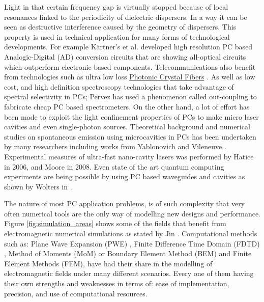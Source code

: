 Light in that certain frequency gap is virtually stopped because of local resonances linked to the periodicity of dielectric dispersers. In a way it can be seen as destructive interference caused by the geometry of dispersers. This property is used in technical application for many forms of technological developments. For example K\"{a}rtner's et al. developed high resolution PC based Analogic-Digital (AD) conversion circuits \cite{F.X.Kaertner2006} that are showing all-optical circuits which outperform electronic based components. Telecommunications also benefit from technologies such as ultra low loss \href{http://en.wikipedia.org/wiki/Photonic-crystal_fiber}{Photonic Crystal Fibers} \cite{A.M.Apetrei2005}. As well as low cost, and high definition spectroscopy technologies that take advantage of spectral selectivity in PCs; Pervez \cite{Pervez2010} has used a phenomenon called out-coupling to fabricate cheap PC based spectrometers. On the other hand, a lot of effort has been made to exploit the light confinement properties of PCs to make micro laser cavities and even single-photon sources. Theoretical background and numerical studies on spontaneous emission using microcavities in PCs has been undertaken by many researchers including works from Yablonovich and Vileneuve \cite{Yablonovich1987,Yablonovich1991,Villeneuve1996}. Experimental measures of ultra-fast nano-cavity lasers was performed by Hatice \cite{Altug2006} in 2006, and Moore \cite{Moore2008} in 2008. Even state of the art quantum computing experiments are being possible by using PC based waveguides and cavities as shown by Wolters in \cite{Wolters2010}.

The nature of most PC application problems, is of such complexity that very often numerical tools are the only way of modelling new designs and performance. Figure \ref{fig:simulation_areas} shows some of the fields that benefit from electromagnetic numerical simulations as stated by Jin \cite{Jin2010}.  Computational methods such as: Plane Wave Expansion (PWE) \cite{StevenG.Johnson2001,Loaiza2011},  Finite Difference Time Domain (FDTD) \cite{A.M.Apetrei2005,Oskooi2009}, Method of Moments (MoM) or Boundary Element Method (BEM) and Finite Element Methods (FEM)\cite{Rodriguez2005,Masanori2001}, have had their share in the modelling of electromagnetic fields under many different scenarios. Every one of them having their own strengths and weaknesses in terms of: ease of implementation, precision, and use of computational resources.

